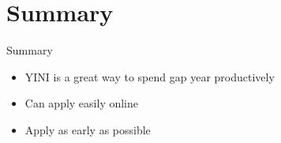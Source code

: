 \documentclass{beamer}
\begin{document}
\section*{Summary}

\begin{frame}{Summary}

  \begin{itemize}
  \item
	  \alert{YINI} is a great way to spend gap year productively
  \item
	  Can apply easily online
  \item
	  Apply as early as possible
  \end{itemize}
\end{frame}
\end{document}
